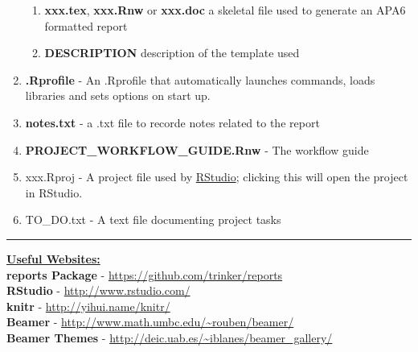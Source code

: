\documentclass{article}\usepackage{graphicx, color}
\begin{document}
\begin{enumerate}
\begin{enumerate}
    \item \textbf{xxx.tex}, \textbf{xxx.Rnw} or \textbf{xxx.doc} a skeletal file used to generate an APA6 formatted report
    \item \textbf{DESCRIPTION} description of the template used
  \end{enumerate} 
  \item \textbf{.Rprofile} - An .Rprofile that automatically launches commands, loads libraries and sets options on start up.
  \item \textbf{notes.txt} - a .txt file to recorde notes related to the report
  \item \textbf{PROJECT\_WORKFLOW\_GUIDE.Rnw} - The workflow guide
  \item{xxx.Rproj} - A project file used by \href{http://www.rstudio.com/}{RStudio}; clicking this will open the project in RStudio. 
  \item{TO\_DO.txt} - A text file documenting project tasks
\end{enumerate}

\vspace{3 mm}
\hrule
\vspace{3 mm}
\noindent \textbf{\underline{Useful Websites:}} \vspace{1.5 mm} \\ 
\textbf{reports Package} - \href{https://github.com/trinker/reports}{https://github.com/trinker/reports}\\ 
\textbf{RStudio} - \href{http://www.rstudio.com/}{http://www.rstudio.com/}\\
\textbf{knitr} - \href{http://yihui.name/knitr/}{http://yihui.name/knitr/}\\
\textbf{Beamer} - \url{http://www.math.umbc.edu/~rouben/beamer/}\\
\textbf{Beamer Themes} - \url{http://deic.uab.es/~iblanes/beamer_gallery/}\\
\end{document}
